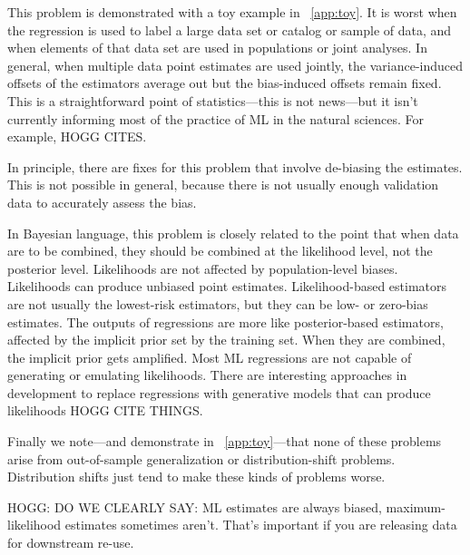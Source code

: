 \documentclass[11pt]{article}
\begin{document}
This problem is demonstrated with a toy example in \appendixname~\ref{app:toy}.
It is worst when the regression is used to label a large data set or catalog or sample of data,
and when elements of that data set are used in populations or joint analyses.
In general, when multiple data point estimates are used jointly, the variance-induced offsets of the estimators average out but the bias-induced offsets remain fixed.
This is a straightforward point of statistics---this is not news---but it isn't currently informing most of the practice of ML in the natural sciences.
For example, HOGG CITES.

In principle, there are fixes for this problem that involve de-biasing the estimates.
This is not possible in general, because there is not usually enough validation data to accurately assess the bias.

In Bayesian language, this problem is closely related to the point that when data are to be combined, they should be combined at the likelihood level, not the posterior level.
Likelihoods are not affected by population-level biases.
Likelihoods can produce unbiased point estimates.
Likelihood-based estimators are not usually the lowest-risk estimators, but they can be low- or zero-bias estimates.
The outputs of regressions are more like posterior-based estimators, affected by the implicit prior set by the training set.
When they are combined, the implicit prior gets amplified.
Most ML regressions are not capable of generating or emulating likelihoods.
There are interesting approaches in development to replace regressions with generative models that can produce likelihoods HOGG CITE THINGS.

Finally we note---and demonstrate in \appendixname~\ref{app:toy}---that none of these problems arise from out-of-sample generalization or distribution-shift problems.
Distribution shifts just tend to make these kinds of problems worse.

HOGG: DO WE CLEARLY SAY: ML estimates are always biased, maximum-likelihood estimates sometimes aren't. That's important if you are releasing data for downstream re-use.
\end{document}
